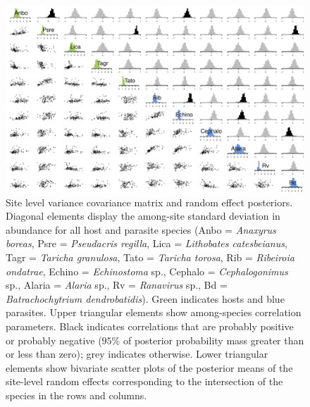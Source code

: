 \begin{figure}[ht]\centering
\includegraphics[width=\linewidth]{figs/ch4/amg_site}
\caption[Site level variance covariance matrix and random effect posteriors]{Site level variance covariance matrix and random effect posteriors. Diagonal elements display the among-site standard deviation in abundance for all host and parasite species (Anbo = \textit{Anaxyrus boreas}, Psre = \textit{Pseudacris regilla}, Lica = \textit{Lithobates catesbeianus}, Tagr = \textit{Taricha granulosa}, Tato = \textit{Taricha torosa}, Rib = \textit{Ribeiroia ondatrae}, Echino = \textit{Echinostoma} sp., Cephalo = \textit{Cephalogonimus} sp., Alaria = \textit{Alaria} sp., Rv = \textit{Ranavirus} sp., Bd = \textit{Batrachochytrium dendrobatidis}). Green indicates hosts and blue parasites. Upper triangular elements show among-species correlation parameters. Black indicates correlations that are probably positive or probably negative ($95\%$ of posterior probability mass greater than or less than zero); grey indicates otherwise. Lower triangular elements show bivariate scatter plots of the posterior means of the site-level random effects corresponding to the intersection of the species in the rows and columns.}
\label{fig:amg_site}
\end{figure}

